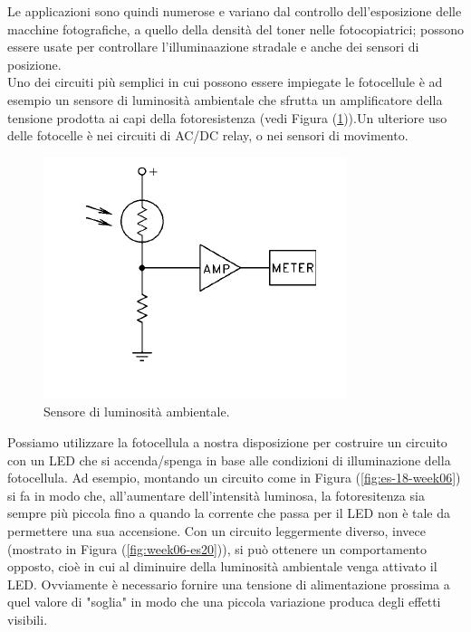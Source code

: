\documentclass[journal, a4paper]{IEEEtran}
\begin{document}
Le applicazioni sono quindi numerose e variano dal controllo dell'esposizione delle macchine fotografiche, a quello della densità del toner nelle fotocopiatrici; possono essere usate per controllare l'illuminaazione stradale e anche dei sensori di posizione. \\
Uno dei circuiti più semplici in cui possono essere impiegate le fotocellule è ad esempio un sensore di luminosità ambientale che sfrutta un amplificatore della tensione prodotta ai capi della fotoresistenza (vedi Figura (\ref{fig:hw6_sens_lum})).Un ulteriore uso delle fotocelle è nei circuiti di AC/DC relay, o nei sensori di movimento.

\begin{figure}
\centering
\includegraphics[width=0.8\linewidth]{./hw6_sens_lum}
\caption{Sensore di luminosità ambientale.}
\label{fig:hw6_sens_lum}
\end{figure}


Possiamo utilizzare la fotocellula a nostra disposizione per costruire un circuito con un LED che si accenda/spenga in base alle condizioni di illuminazione della fotocellula. Ad esempio, montando un circuito come in Figura (\ref{fig:es-18-week06}) si fa in modo che, all'aumentare dell'intensità luminosa, la fotoresitenza sia sempre più piccola fino a quando la corrente che passa per il LED non è tale da permettere una sua accensione. Con un circuito leggermente diverso, invece (mostrato in Figura (\ref{fig:week06-es20})), si può ottenere un comportamento opposto, cioè in cui al diminuire della luminosità ambientale venga attivato il LED. Ovviamente è necessario fornire una tensione di alimentazione prossima a quel valore di "soglia" in modo che una piccola variazione produca degli effetti visibili.
\end{document}

